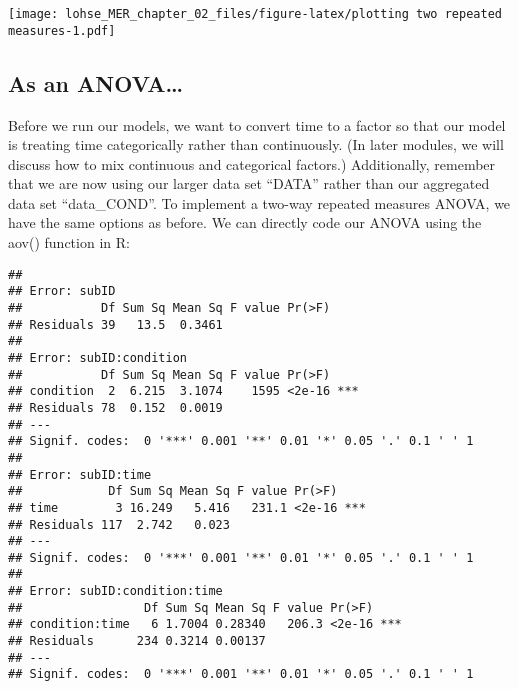 \documentclass[]{article}
\newenvironment{Shaded}{\begin{snugshade}}{\end{snugshade}}
\newcommand{\DataTypeTok}[1]{\textcolor[rgb]{0.13,0.29,0.53}{#1}}
\newcommand{\KeywordTok}[1]{\textcolor[rgb]{0.13,0.29,0.53}{\textbf{#1}}}
\newcommand{\NormalTok}[1]{#1}
\newcommand{\OperatorTok}[1]{\textcolor[rgb]{0.81,0.36,0.00}{\textbf{#1}}}
\newcommand{\StringTok}[1]{\textcolor[rgb]{0.31,0.60,0.02}{#1}}
\begin{document}
\texttt{[image: lohse\_MER\_chapter\_02\_files/figure-latex/plotting two repeated measures-1.pdf]}

\hypertarget{as-an-anova-1}{%
\subsection{As an ANOVA\ldots{}}\label{as-an-anova-1}}

Before we run our models, we want to convert time to a factor so that
our model is treating time categorically rather than continuously. (In
later modules, we will discuss how to mix continuous and categorical
factors.) Additionally, remember that we are now using our larger data
set ``DATA'' rather than our aggregated data set ``data\_COND''. To
implement a two-way repeated measures ANOVA, we have the same options as
before. We can directly code our ANOVA using the aov() function in R:

\begin{Shaded}
\end{Shaded}

\begin{verbatim}
## 
## Error: subID
##           Df Sum Sq Mean Sq F value Pr(>F)
## Residuals 39   13.5  0.3461               
## 
## Error: subID:condition
##           Df Sum Sq Mean Sq F value Pr(>F)    
## condition  2  6.215  3.1074    1595 <2e-16 ***
## Residuals 78  0.152  0.0019                   
## ---
## Signif. codes:  0 '***' 0.001 '**' 0.01 '*' 0.05 '.' 0.1 ' ' 1
## 
## Error: subID:time
##            Df Sum Sq Mean Sq F value Pr(>F)    
## time        3 16.249   5.416   231.1 <2e-16 ***
## Residuals 117  2.742   0.023                   
## ---
## Signif. codes:  0 '***' 0.001 '**' 0.01 '*' 0.05 '.' 0.1 ' ' 1
## 
## Error: subID:condition:time
##                 Df Sum Sq Mean Sq F value Pr(>F)    
## condition:time   6 1.7004 0.28340   206.3 <2e-16 ***
## Residuals      234 0.3214 0.00137                   
## ---
## Signif. codes:  0 '***' 0.001 '**' 0.01 '*' 0.05 '.' 0.1 ' ' 1
\end{verbatim}
\end{document}
